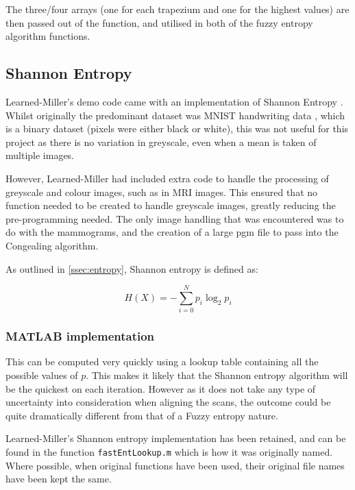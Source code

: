 The three/four arrays (one for each trapezium and one for the highest values) are then passed out of the function, and utilised in both of the fuzzy entropy algorithm functions.

\newpage
\subsection{Shannon Entropy}
\label{ssec:shannon-entropy}

Learned-Miller's demo code came with an implementation of Shannon Entropy \cite{joint-alignment}. Whilst originally the predominant dataset was MNIST handwriting data \cite{lecun1998gradientbased}, which is a binary dataset (pixels were either black or white), this was not useful for this project as there is no variation in greyscale, even when a mean is taken of multiple images.

However, Learned-Miller had included extra code to handle the processing of greyscale and colour images, such as in MRI images. This ensured that no function needed to be created to handle greyscale images, greatly reducing the pre-programming needed. The only image handling that was encountered was to do with the mammograms, and the creation of a large pgm file to pass into the \Gls{Congealing} algorithm.

As outlined in \ref{ssec:entropy}, Shannon entropy is defined as:

\begin{equation}
  H(X) = - \displaystyle\sum_{i=0}^{N}{p_i \log_2 p_i}
\end{equation}

\subsubsection{MATLAB implementation}

This can be computed very quickly using a lookup table containing all the possible values of $p$. This makes it likely that the Shannon entropy algorithm will be the quickest on each iteration. However as it does not take any type of uncertainty into consideration when aligning the scans, the outcome could be quite dramatically different from that of a Fuzzy entropy nature.

Learned-Miller's Shannon entropy implementation has been retained, and can be found in the function \texttt{fastEntLookup.m} which is how it was originally named. Where possible, when original functions have been used, their original file names have been kept the same.

